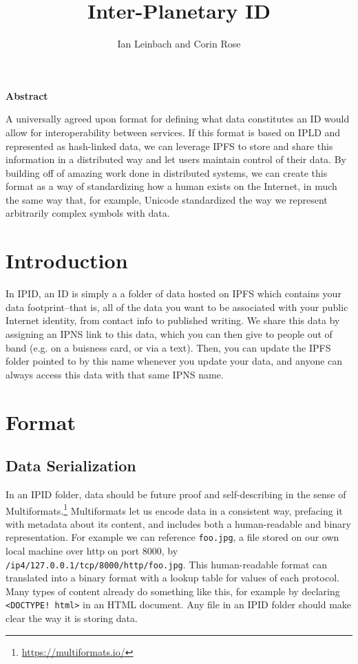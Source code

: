 \documentclass{article}
\author{Ian Leinbach and Corin Rose}
\title{Inter-Planetary ID}
\begin{document}
\maketitle

\begin{center}
\textbf{Abstract} 
\end{center}

A universally agreed upon format for defining what data constitutes an ID would allow for interoperability between services. If this format is based on IPLD and represented as hash-linked data, we can leverage IPFS to store and share this information in a distributed way and let users maintain control of their data. By building off of amazing work done in distributed systems, we can create this format as a way of standardizing how a human exists on the Internet, in much the same way that, for example, Unicode standardized the way we represent arbitrarily complex symbols with data.  

\section{Introduction}
In IPID, an ID is simply a a folder of data hosted on IPFS which contains your data footprint--that is, all of the data you want to be associated with your public Internet identity, from contact info to published writing. We share this data by assigning an IPNS link to this data, which you can then give to people out of band (e.g. on a buisness card, or via a text). Then, you can update the IPFS folder pointed to by this name whenever you update your data, and anyone can always access this data with that same IPNS name. 

\section{Format}

\subsection{Data Serialization}

In an IPID folder, data should be future proof and self-describing in the sense of Multiformats.\footnote{\url{https://multiformats.io/}} Multiformats let us encode data in a consistent way, prefacing it with metadata about its content, and includes both a human-readable and binary representation. For example we can reference \texttt{foo.jpg}, a file stored on our own local machine over http on port 8000, by \texttt{/ip4/127.0.0.1/tcp/8000/http\-/foo.jpg}. This human-readable format can translated into a binary format with a lookup table for values of each protocol. Many types of content already do something like this, for example by declaring \texttt{<DOCTYPE! html>} in an HTML document. Any file in an IPID folder should make clear the way it is storing data.   
\end{document}
